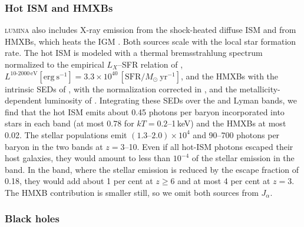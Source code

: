 \documentclass[apj,twocolumn, appendixfloats, twocolappendix, numberedappendix, tighten]{openjournal}
\DeclareRobustCommand{\lumina}{\mbox{\textsc{lumina}}\xspace}
\begin{document}
\begin{appendix}
\subsubsection{Hot ISM and HMXBs}

\lumina also includes X-ray emission from the shock-heated diffuse ISM and from HMXBs, which heats the IGM \citep{Zier2026}. Both sources scale with the local star formation rate. The hot ISM is modeled with a thermal bremsstrahlung spectrum normalized to the empirical $L_X$--SFR relation of \citet{Mineo2012}, $L^{10\text{-}2000\,\mathrm{eV}}[\mathrm{erg \ s^{-1}}]= 3.3 \times 10^{40}\,\left[\mathrm{SFR}/M_\odot\ \mathrm{yr}^{-1}\right]$, and the HMXBs with the intrinsic SEDs of \citet{Fragos2013}, with the normalization corrected in \citet{Fragos2016}, and the metallicity-dependent luminosity of \citet{Madau2017}. Integrating these SEDs over the  and  Lyman bands, we find that the hot ISM emits about 0.45 photons per baryon incorporated into stars in each band (at most 0.78 for $kT = 0.2$--1\,keV) and the HMXBs at most 0.02. The stellar populations emit $(1.3\text{--}2.0)\times10^4$ and 90--700 photons per baryon in the two bands at $z = 3$--10. Even if all hot-ISM photons escaped their host galaxies, they would amount to less than $10^{-4}$ of the stellar emission in the  band. In the  band, where the stellar emission is reduced by the escape fraction of 0.18, they would add about 1 per cent at $z \geq 6$ and at most 4 per cent at $z = 3$. The HMXB contribution is smaller still, so we omit both sources from $J_\alpha$.


\subsubsection{Black holes}


\end{appendix}
\end{document}

